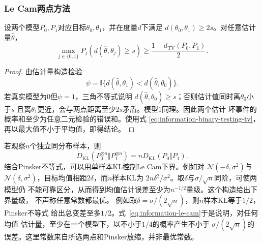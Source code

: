 \subsubsection{Le Cam两点方法}
\begin{theorem}[Le Cam两点下界]
\label{thm:information-le-cam}
设两个模型\(P_0,P_1\)对应目标\(\theta_0,\theta_1\)，并在度量\(d\)下满足
\(d(\theta_0,\theta_1)\geq2s\)。对任意估计量\(\widehat{\theta}\)，
\begin{equation}
  \max_{j\in\{0,1\}}
  P_j\!\left(
    d(\widehat{\theta},\theta_j)\geq s
  \right)
  \geq
  \frac{1-d_{\mathrm{TV}}(P_0,P_1)}{2}.
  \label{eq:information-le-cam}
\end{equation}
\end{theorem}
\begin{proof}
由估计量构造检验
\[
  \psi=
  \mathbb{I}\{
    d(\widehat{\theta},\theta_1)
    <
    d(\widehat{\theta},\theta_0)
  \}.
\]
若真实模型为\(0\)但\(\psi=1\)，三角不等式说明
\(d(\widehat{\theta},\theta_0)\geq s\)；否则估计值同时离\(\theta_0\)小于\(s\)
且离\(\theta_1\)更近，会与两点距离至少\(2s\)矛盾。模型\(1\)同理。因此两个估计
坏事件的概率和至少为任意二元检验的错误和。使用式
\eqref{eq:information-binary-testing-tv}，再以最大值不小于平均值，即得结论。
\end{proof}
若观察\(n\)个独立同分布样本，则
\[
  D_{\mathrm{KL}}(P_0^{\otimes n}\Vert P_1^{\otimes n})
  =
  nD_{\mathrm{KL}}(P_0\Vert P_1).
\]
结合Pinsker不等式，可以用单样本KL控制Le Cam下界。例如对
\(\mathcal{N}(-\delta,\sigma^2)\)与
\(\mathcal{N}(\delta,\sigma^2)\)，目标均值相距\(2\delta\)，而\(n\)样本KL为
\(2n\delta^2/\sigma^2\)。取\(\delta\)与\(\sigma/\sqrt n\)同阶，可使两模型仍
不能可靠区分，从而得到均值估计误差至少为\(n^{-1/2}\)量级。这个构造给出下界量级，
不声称任意常数都最优。
例如取\(\delta=\sigma/(2\sqrt n)\)，则\(n\)样本KL等于\(1/2\)，Pinsker不等式
给出总变差至多\(1/2\)。式~\eqref{eq:information-le-cam}于是说明，对任何均值
估计量，至少在一个模型下，以不小于\(1/4\)的概率产生不小于
\(\sigma/(2\sqrt n)\)的误差。这里常数来自所选两点和Pinsker放缩，并非最优常数。

